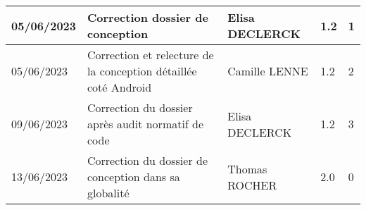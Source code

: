 \begin{center}
\begin{longtable}[l]{|p{2cm}|p{5.8cm}|p{2.8cm}|p{1.4cm}|p{1.7cm}|}
    \hline
        05/06/2023 & Correction dossier de conception & Elisa \newline DECLERCK & 1.2 & 1 \\
    \hline
        05/06/2023 & Correction et relecture de la conception détaillée coté Android & Camille \newline LENNE & 1.2 & 2 \\
    \hline
        09/06/2023 & Correction du dossier après audit normatif de code & Elisa \newline DECLERCK & 1.2 & 3 \\
    \hline
        13/06/2023 & Correction du dossier de conception dans sa globalité & Thomas \newline ROCHER & 2.0 & 0 \\
    \hline

\end{longtable}

\end{center}
\newpage %